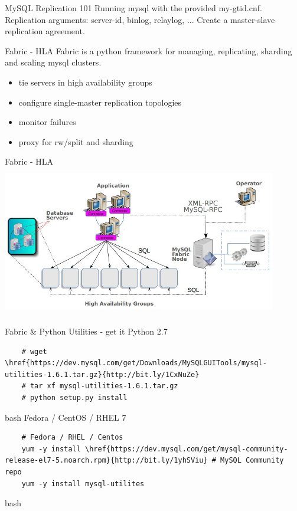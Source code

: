 \documentclass{beamer}[10]
\begin{document}
\begin{pyframe}{MySQL Replication 101}
Running mysql with the provided my-gtid.cnf.
Replication arguments: server-id, binlog, relaylog, ...
Create a master-slave replication agreement.
\end{pyframe}


%
%
\begin{pyframe}{Fabric - HLA}
Fabric is a python framework for managing, replicating, sharding and scaling mysql clusters.
\begin{itemize}
\item tie servers in high availability groups
\item configure single-master replication topologies
\item monitor failures
\item proxy for rw/split and sharding
\end{itemize}
\end{pyframe}


\begin{pyframe}{Fabric - HLA}
\includegraphics[height=6.6cm,width=12cm]{images/mysql-fabric-hla.jpg}
\end{pyframe}


\begin{pyframe}{Fabric \& Python Utilities - get it}
Python 2.7
    \begin{verbatim}
    # wget \href{https://dev.mysql.com/get/Downloads/MySQLGUITools/mysql-utilities-1.6.1.tar.gz}{http://bit.ly/1CxNuZe}
    # tar xf mysql-utilities-1.6.1.tar.gz
    # python setup.py install
    \end{verbatim}{bash}
Fedora / CentOS / RHEL 7
    \begin{verbatim}
    # Fedora / RHEL / Centos
    yum -y install \href{https://dev.mysql.com/get/mysql-community-release-el7-5.noarch.rpm}{http://bit.ly/1yhSViu} # MySQL Community repo
    yum -y install mysql-utilites
    \end{verbatim}{bash}
\end{pyframe}
\end{document}
